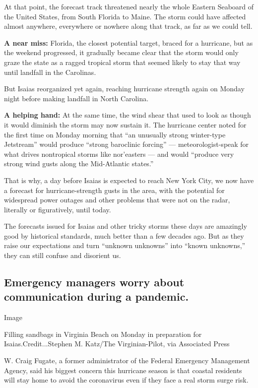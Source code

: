 At that point, the forecast track threatened nearly the whole Eastern
Seaboard of the United States, from South Florida to Maine. The storm
could have affected almost anywhere, everywhere or nowhere along that
track, as far as we could tell.

\textbf{A near miss:} Florida, the closest potential target, braced for
a hurricane, but as the weekend progressed, it gradually became clear
that the storm would only graze the state as a ragged tropical storm
that seemed likely to stay that way until landfall in the Carolinas.

But Isaias reorganized yet again, reaching hurricane strength again on
Monday night before making landfall in North Carolina.

\textbf{A helping hand:} At the same time, the wind shear that used to
look as though it would diminish the storm may now sustain it. The
hurricane center noted for the first time on Monday morning that ``an
unusually strong winter-type Jetstream'' would produce ``strong
baroclinic forcing'' --- meteorologist-speak for what drives nontropical
storms like nor'easters --- and would ``produce very strong wind gusts
along the Mid-Atlantic states.''

That is why, a day before Isaias is expected to reach New York City, we
now have a forecast for hurricane-strength gusts in the area, with the
potential for widespread power outages and other problems that were not
on the radar, literally or figuratively, until today.

The forecasts issued for Isaias and other tricky storms these days are
amazingly good by historical standards, much better than a few decades
ago. But as they raise our expectations and turn ``unknown unknowns''
into ``known unknowns,'' they can still confuse and disorient us.

\hypertarget{emergency-managers-worry-about-communication-during-a-pandemic}{%
\subsection{Emergency managers worry about communication during a
pandemic.}\label{emergency-managers-worry-about-communication-during-a-pandemic}}

Image

Filling sandbags in Virginia Beach on Monday in preparation for
Isaias.Credit...Stephen M. Katz/The Virginian-Pilot, via Associated
Press

W. Craig Fugate, a former administrator of the Federal Emergency
Management Agency, said his biggest concern this hurricane season is
that coastal residents will stay home to avoid the coronavirus even if
they face a real storm surge risk.

